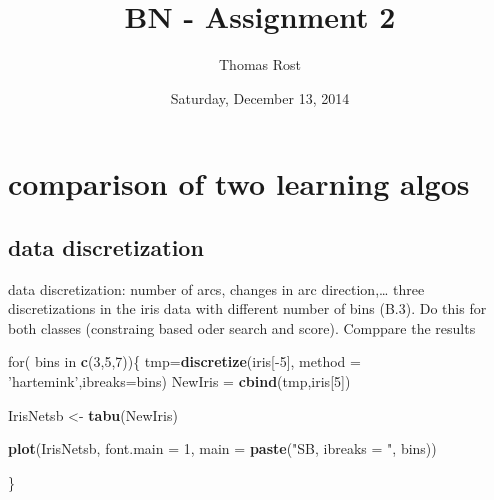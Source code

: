 \documentclass[]{article}
\title{BN - Assignment 2}
\author{Thomas Rost}
\date{Saturday, December 13, 2014}
\newenvironment{Shaded}{\begin{snugshade}}{\end{snugshade}}
\newcommand{\KeywordTok}[1]{\textcolor[rgb]{0.13,0.29,0.53}{\textbf{{#1}}}}
\newcommand{\DataTypeTok}[1]{\textcolor[rgb]{0.13,0.29,0.53}{{#1}}}
\newcommand{\DecValTok}[1]{\textcolor[rgb]{0.00,0.00,0.81}{{#1}}}
\newcommand{\StringTok}[1]{\textcolor[rgb]{0.31,0.60,0.02}{{#1}}}
\newcommand{\NormalTok}[1]{{#1}}
\begin{document}
\maketitle


{
\hypersetup{linkcolor=black}
\setcounter{tocdepth}{2}
\tableofcontents
}
\newpage

\section{comparison of two learning
algos}\label{comparison-of-two-learning-algos}

\subsection{data discretization}\label{data-discretization}

data discretization: number of arcs, changes in arc direction,\ldots{}
three discretizations in the iris data with different number of bins
(B.3). Do this for both classes (constraing based oder search and
score). Comppare the results

\begin{Shaded}
\begin{Highlighting}[]
\NormalTok{for( bins in }\KeywordTok{c}\NormalTok{(}\DecValTok{3}\NormalTok{,}\DecValTok{5}\NormalTok{,}\DecValTok{7}\NormalTok{))\{}
\NormalTok{tmp=}\KeywordTok{discretize}\NormalTok{(iris[-}\DecValTok{5}\NormalTok{], }\DataTypeTok{method =} \StringTok{'hartemink'}\NormalTok{,}\DataTypeTok{ibreaks=}\NormalTok{bins) }
\NormalTok{NewIris =}\StringTok{ }\KeywordTok{cbind}\NormalTok{(tmp,iris[}\DecValTok{5}\NormalTok{]) }

\NormalTok{IrisNetsb <-}\StringTok{ }\KeywordTok{tabu}\NormalTok{(NewIris)}

\KeywordTok{plot}\NormalTok{(IrisNetsb, }\DataTypeTok{font.main =} \DecValTok{1}\NormalTok{, }\DataTypeTok{main =} \KeywordTok{paste}\NormalTok{(}\StringTok{"SB, ibreaks = "}\NormalTok{, bins))}

\NormalTok{\}}
\end{Highlighting}
\end{Shaded}
\end{document}
